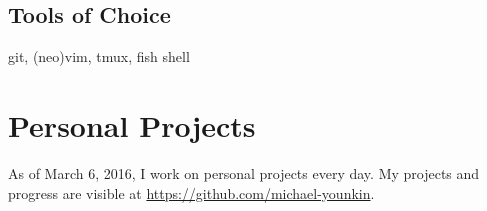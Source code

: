 \documentclass[letterpaper]{article}
\begin{document}
\subsection*{Tools of Choice}
git, (neo)vim, tmux, fish shell


\section*{Personal Projects}
As of March 6, 2016, I work on personal projects every day.
My projects and progress are visible at \href{https://github.com/michael-younkin}{https://github.com/michael-younkin}.


\end{document}
